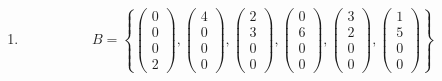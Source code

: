 \documentclass[a4paper]{scrartcl}
\begin{document}
\begin{enumerate}
\begin{proof}
\begin{enumerate}
            \end{enumerate}
        \end{proof}

    \item
        \begin{equation}
            B = \left\{
                \begin{pmatrix}
                    0 \\ 0 \\ 0 \\ 2
                \end{pmatrix}
                ,
                \begin{pmatrix}
                    4 \\ 0 \\ 0 \\ 0
                \end{pmatrix}
                ,
                \begin{pmatrix}
                    2 \\ 3 \\ 0 \\ 0
                \end{pmatrix}
                ,
                \begin{pmatrix}
                    0 \\ 6 \\ 0 \\ 0
                \end{pmatrix}
                ,
                \begin{pmatrix}
                    3 \\ 2 \\ 0 \\ 0
                \end{pmatrix}
                ,
                \begin{pmatrix}
                    1 \\ 5 \\ 0 \\ 0
                \end{pmatrix}
            \right\}
        \end{equation}

\end{enumerate}
\end{document}
